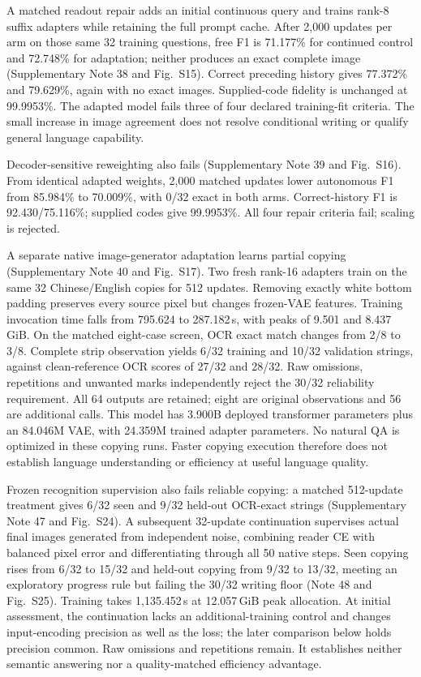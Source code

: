 A matched readout repair adds an initial continuous query and trains rank-8
suffix adapters while retaining the full prompt cache. After 2,000 updates
per arm on those same 32 training questions, free F1 is 71.177\% for continued
control and 72.748\% for adaptation; neither produces an exact complete image
(Supplementary Note 38 and Fig.~S15). Correct preceding history gives
77.372\% and 79.629\%, again with no exact images. Supplied-code fidelity is
unchanged at 99.9953\%. The adapted model fails three of four declared
training-fit criteria. The small increase in image agreement does not resolve
conditional writing or qualify general language capability.

Decoder-sensitive reweighting also fails (Supplementary Note 39 and
Fig.~S16). From identical adapted weights, 2,000 matched updates lower
autonomous F1 from 85.984\% to 70.009\%, with 0/32 exact in both arms.
Correct-history F1 is 92.430/75.116\%; supplied codes give 99.9953\%.
All four repair criteria fail; scaling is rejected.

A separate native image-generator adaptation learns partial copying
(Supplementary Note 40 and Fig.~S17). Two fresh rank-16 adapters train on the
same 32 Chinese/English copies for 512 updates. Removing exactly white bottom
padding preserves every source pixel but changes frozen-VAE features. Training
invocation time falls from 795.624 to 287.182\,s, with peaks of 9.501 and
8.437\,GiB. On the matched eight-case screen, OCR exact match changes from
2/8 to 3/8. Complete strip observation yields 6/32 training and 10/32 validation
strings, against clean-reference OCR scores of 27/32 and 28/32. Raw omissions,
repetitions and unwanted marks independently reject the 30/32 reliability
requirement. All 64 outputs are retained; eight are original observations and
56 are additional calls. This model has 3.900B deployed transformer parameters
plus an 84.046M VAE, with 24.359M trained adapter parameters. No natural QA is
optimized in these copying runs. Faster copying execution therefore does not
establish language understanding or efficiency at useful language quality.

Frozen recognition supervision also fails reliable copying: a matched
512-update treatment gives 6/32 seen and 9/32 held-out OCR-exact strings
(Supplementary Note 47 and Fig.~S24). A subsequent 32-update continuation
supervises actual final images generated from independent noise, combining
reader CE with balanced pixel error and differentiating through all 50
native steps\cite{draft}. Seen copying rises from 6/32 to 15/32 and held-out
copying from 9/32 to 13/32, meeting an exploratory progress rule but failing
the 30/32 writing floor (Note 48 and Fig.~S25). Training takes 1,135.452\,s
at 12.057\,GiB peak allocation. At initial assessment, the continuation lacks
an additional-training control and changes input-encoding precision as well
as the loss; the later comparison below holds precision common. Raw omissions
and repetitions remain. It establishes neither semantic answering nor a
quality-matched efficiency advantage.

